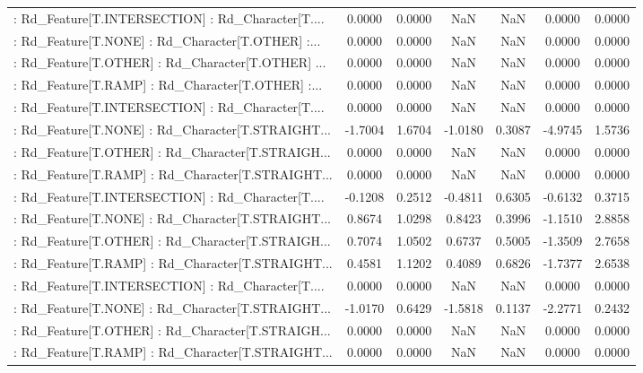 \begin{longtable}{p{4cm}cccccc}
 : Rd\_Feature[T.INTERSECTION] : Rd\_Character[T.... &  0.0000 &    0.0000 &     NaN &          NaN &  0.0000 &  0.0000 \\
 : Rd\_Feature[T.NONE] : Rd\_Character[T.OTHER] :... &  0.0000 &    0.0000 &     NaN &          NaN &  0.0000 &  0.0000 \\
 : Rd\_Feature[T.OTHER] : Rd\_Character[T.OTHER] ... &  0.0000 &    0.0000 &     NaN &          NaN &  0.0000 &  0.0000 \\
 : Rd\_Feature[T.RAMP] : Rd\_Character[T.OTHER] :... &  0.0000 &    0.0000 &     NaN &          NaN &  0.0000 &  0.0000 \\
 : Rd\_Feature[T.INTERSECTION] : Rd\_Character[T.... &  0.0000 &    0.0000 &     NaN &          NaN &  0.0000 &  0.0000 \\
 : Rd\_Feature[T.NONE] : Rd\_Character[T.STRAIGHT... & -1.7004 &    1.6704 & -1.0180 &       0.3087 & -4.9745 &  1.5736 \\
 : Rd\_Feature[T.OTHER] : Rd\_Character[T.STRAIGH... &  0.0000 &    0.0000 &     NaN &          NaN &  0.0000 &  0.0000 \\
 : Rd\_Feature[T.RAMP] : Rd\_Character[T.STRAIGHT... &  0.0000 &    0.0000 &     NaN &          NaN &  0.0000 &  0.0000 \\
 : Rd\_Feature[T.INTERSECTION] : Rd\_Character[T.... & -0.1208 &    0.2512 & -0.4811 &       0.6305 & -0.6132 &  0.3715 \\
 : Rd\_Feature[T.NONE] : Rd\_Character[T.STRAIGHT... &  0.8674 &    1.0298 &  0.8423 &       0.3996 & -1.1510 &  2.8858 \\
 : Rd\_Feature[T.OTHER] : Rd\_Character[T.STRAIGH... &  0.7074 &    1.0502 &  0.6737 &       0.5005 & -1.3509 &  2.7658 \\
 : Rd\_Feature[T.RAMP] : Rd\_Character[T.STRAIGHT... &  0.4581 &    1.1202 &  0.4089 &       0.6826 & -1.7377 &  2.6538 \\
 : Rd\_Feature[T.INTERSECTION] : Rd\_Character[T.... &  0.0000 &    0.0000 &     NaN &          NaN &  0.0000 &  0.0000 \\
 : Rd\_Feature[T.NONE] : Rd\_Character[T.STRAIGHT... & -1.0170 &    0.6429 & -1.5818 &       0.1137 & -2.2771 &  0.2432 \\
 : Rd\_Feature[T.OTHER] : Rd\_Character[T.STRAIGH... &  0.0000 &    0.0000 &     NaN &          NaN &  0.0000 &  0.0000 \\
 : Rd\_Feature[T.RAMP] : Rd\_Character[T.STRAIGHT... &  0.0000 &    0.0000 &     NaN &          NaN &  0.0000 &  0.0000 \\

\end{longtable}
